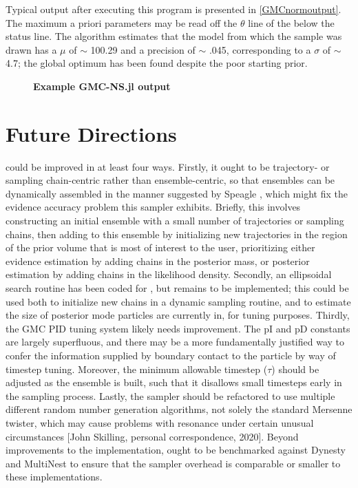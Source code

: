 Typical output after executing this program is presented in \autoref{GMCnormoutput}. The maximum a priori parameters may be read off the $\theta$ line of the  below the status line. The algorithm estimates that the model from which the sample was drawn has a $\mu$ of $\sim$ 100.29 and a precision of $\sim$ .045, corresponding to a $\sigma$ of $\sim$ 4.7; the global optimum has been found despite the poor starting prior.

\begin{figure}[!h]
    \caption{{\bf Example GMC-NS.jl output}}
    \label{GMCnormoutput}
\end{figure}

\section{Future Directions}
\label{ssec:gmcfuturedir}
 could be improved in at least four ways. Firstly, it ought to be trajectory- or sampling chain-centric rather than ensemble-centric, so that ensembles can be dynamically assembled in the manner suggested by Speagle \cite{Speagle2019}, which might fix the evidence accuracy problem this sampler exhibits. Briefly, this involves constructing an initial ensemble with a small number of trajectories or sampling chains, then adding to this ensemble by initializing new trajectories in the region of the prior volume that is most of interest to the user, prioritizing either evidence estimation by adding chains in the posterior mass, or posterior estimation by adding chains in the likelihood density. Secondly, an ellipsoidal search routine has been coded for , but remains to be implemented; this could be used both to initialize new chains in a dynamic sampling routine, and to estimate the size of posterior mode particles are currently in, for tuning purposes. Thirdly, the GMC PID tuning system likely needs improvement. The pI and pD constants are largely superfluous, and there may be a more fundamentally justified way to confer the information supplied by boundary contact to the particle by way of timestep tuning. Moreover, the minimum allowable timestep ($\tau$) should be adjusted as the ensemble is built, such that it disallows small timesteps early in the sampling process. Lastly, the sampler should be refactored to use multiple different random number generation algorithms, not solely the standard Mersenne twister, which may cause problems with resonance under certain unusual circumstances [John Skilling, personal correspondence, 2020]. Beyond improvements to the implementation,  ought to be benchmarked against Dynesty and MultiNest to ensure that the sampler overhead is comparable or smaller to these implementations.